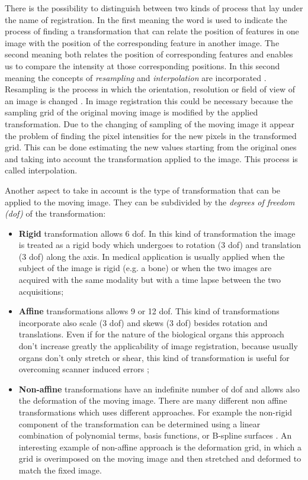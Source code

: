 \documentclass{standalone}
\begin{document}
There is the possibility to distinguish between two kinds of process that lay under the name of registration. In the first meaning the word is used to indicate the process of finding a transformation that can relate the position of features in one image with the position of the corresponding feature in another image. The second meaning both relates the position of corresponding features and enables us to compare the intensity at those corresponding positions. In this second meaning the concepts of \textit{resampling} and \textit{interpolation} are incorporated \cite{ART:Hill}.  
Resampling is the process in which the orientation, resolution or field of view of an image is changed \cite{Slicer_Resampling}. In image registration this could be necessary because the sampling grid of the original moving image is modified by the applied transformation.
Due to the changing of sampling of the moving image it appear the problem of finding the pixel intensities for the new pixels in the transformed grid. This can be done estimating the new values starting from the original ones and taking into account the transformation applied to the image. This process is called interpolation. 

Another aspect to take in account is the type of transformation that can be applied to the moving image. They can be subdivided by the \textit{degrees of freedom (dof)} of the transformation:
\begin{itemize}
    \item \textbf{Rigid} transformation allows 6 dof. In this kind of transformation the image is treated as a rigid body which undergoes to rotation (3 dof) and translation (3 dof) along the axis. In medical application is usually applied when the subject of the image is rigid (e.g. a bone) or when the two images are acquired with the same modality but with a time lapse between the two acquisitions;
    
    \item \textbf{Affine} transformations allows 9 or 12 dof. This kind of transformations incorporate also scale (3 dof) and skews (3 dof) besides rotation and translations.
    Even if for the nature of the biological organs this approach don't increase greatly the applicability of image registration, because usually organs don't only stretch or shear, this kind of transformation is useful for overcoming scanner induced errors \cite{ART:Hill};
    
    \item \textbf{Non-affine} transformations have an indefinite number of dof and allows also the deformation of the moving image. 
    There are many different non affine transformations which uses different approaches. For example the non-rigid component of the transformation can be determined using a linear combination of polynomial terms, basis functions, or B-spline surfaces \cite{ART:Hill}.
    An interesting example of non-affine approach is the deformation grid, in which a grid is overimposed on the moving image and then stretched and deformed to match the fixed image.
\end{itemize}
\end{document}
